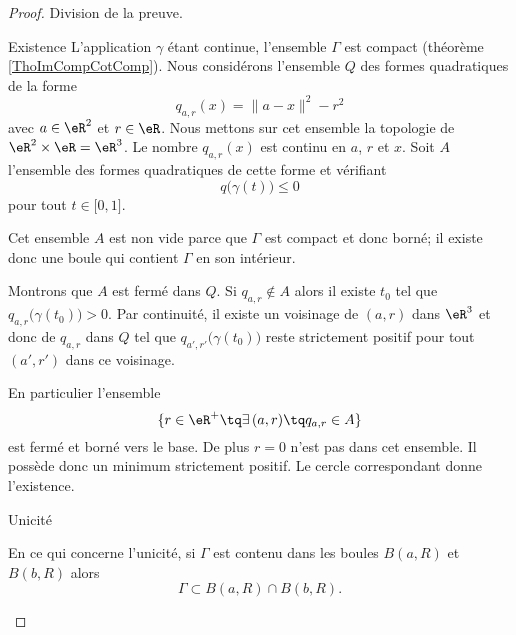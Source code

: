\begin{proof}
    Division de la preuve.
    \begin{subproof}
        \item[Existence]
        L'application \( \gamma\) étant continue, l'ensemble \( \Gamma\) est compact (théorème \ref{ThoImCompCotComp}). Nous considérons l'ensemble \( Q\) des formes quadratiques de la forme 
        \begin{equation}
            q_{a,r}(x)=\| a-x \|^2-r^2
        \end{equation}
        avec \( a\in \eR^2\) et \( r\in \eR\). Nous mettons sur cet ensemble la topologie de \( \eR^2\times \eR=\eR^3\). Le nombre \( q_{a,r}(x)\) est continu en \( a\), \( r\) et \( x\). Soit \( A\) l'ensemble des formes quadratiques de cette forme et vérifiant
        \begin{equation}
            q\big( \gamma(t) \big)\leq 0
        \end{equation}
        pour tout \( t\in\mathopen[ 0 , 1 \mathclose]\). 

        Cet ensemble \( A\) est non vide parce que \( \Gamma \) est compact et donc borné; il existe donc une boule qui contient \( \Gamma\) en son intérieur.

        Montrons que \( A\) est fermé dans \( Q\). Si \( q_{a,r}\notin A\) alors il existe \( t_0\) tel que \( q_{a,r}\big( \gamma(t_0) \big)>0\). Par continuité, il existe un voisinage de \( (a,r)\) dans \( \eR^3\)  et donc de \( q_{a,r}\) dans \( Q\) tel que \( q_{a',r'}\big( \gamma(t_0) \big)\) reste strictement positif pour tout \( (a',r')\) dans ce voisinage.

        En particulier l'ensemble 
        \begin{equation}
            \{ r\in \eR^+\tq \exists\,(a,r)\tq q_{a,r}\in A \}
        \end{equation}
        est fermé et borné vers le base. De plus \( r=0\) n'est pas dans cet ensemble. Il possède donc un minimum strictement positif. Le cercle correspondant donne l'existence.
    \item[Unicité]

        En ce qui concerne l'unicité, si \( \Gamma\) est contenu dans les boules \( B(a,R)\) et \( B(b,R)\) alors 
        \begin{equation}
            \Gamma\subset B(a,R)\cap B(b,R).
        \end{equation}

        \begin{center}
            
        \end{center}


\end{subproof}
\end{proof}
